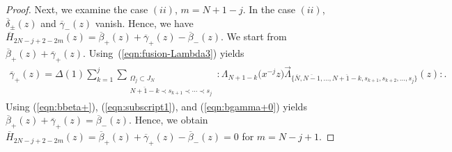 \documentclass[10pt,a4paper]{amsart}
\numberwithin{equation}{section}
\begin{document}
\begin{proof}
Next, we examine the case $(ii)$, $m=N+1-j$.
In the case $(ii)$, $\overline{\delta}_\pm(z)$ and
$\overline{\gamma}_-(z)$ vanish. Hence, we have
$\overline{H}_{2N-j+2-2m}(z)=\overline{\beta}_+(z)+\overline{\gamma}_+(z)
-\overline{\beta}_-(z)$.
We start from $\overline{\beta}_+(z)+\overline{\gamma}_+(z)$.
Using~(\ref{eqn:fusion-Lambda3}) yields
\begin{gather}
\overline{\gamma}_+(z)=\Delta(1)\sum_{k=1}^{j}
\sum\limits_{\substack{\Omega_j \subset J_N
\\ \overline{N+1-k}\prec s_{k+1}\prec \cdots \prec s_j}}\!\!\!\!\!\!\!\!\!\!
{:}\Lambda_{N+1-k}\big(x^{-j}z\big)\overrightarrow{\Lambda}_{\{\overline{N},\overline{N-1},
\dots,\overline{N+1-k}, s_{k+1}, s_{k+2}, \dots, s_j\}}(z){:}.
\label{eqn:bgamma+0}
\end{gather}
Using (\ref{eqn:bbeta+}), (\ref{eqn:subscript1}), and (\ref{eqn:bgamma+0})
yields $\overline{\beta}_+(z)+\overline{\gamma}_+(z)=\overline{\beta}_-(z)$.
Hence, we obtain
$\overline{H}_{2N-j+2-2m}(z)\allowbreak=\overline{\beta}_+(z)
+\overline{\gamma}_+(z)-\overline{\beta}_-(z)=0$
for $m=N-j+1$.


\end{proof}
\end{document}
